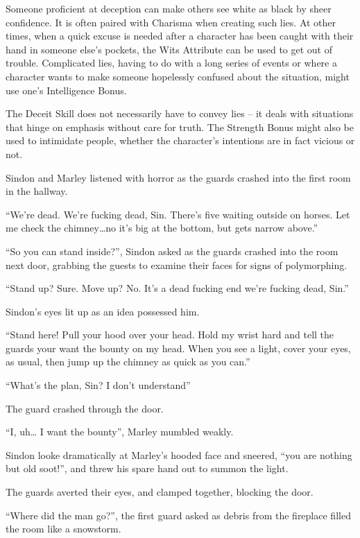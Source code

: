 \begin{multicols}{2}
Someone proficient at deception can make others see white as black by sheer confidence. It is often paired with Charisma when creating such lies. At other times, when a quick excuse is needed after a character has been caught with their hand in someone else's pockets, the Wits Attribute can be used to get out of trouble. Complicated lies, having to do with a long series of events or where a character wants to make someone hopelessly confused about the situation, might use one's Intelligence Bonus.

The Deceit Skill does not necessarily have to convey lies -- it deals with situations that hinge on emphasis without care for truth.
The Strength Bonus might also be used to intimidate people, whether the character's intentions are in fact vicious or not.

\begin{exampletext}
  Sindon and Marley listened with horror as the guards crashed into the first room in the hallway.

  ``We're dead.
  We're fucking dead, Sin.
  There's five waiting outside on horses.
  Let me check the chimney\ldots no it's big at the bottom, but gets narrow above.''

  ``So you can stand inside?'', Sindon asked as the guards crashed into the room next door, grabbing the guests to examine their faces for signs of polymorphing.

  ``Stand up?
  Sure.
  Move up?
  No.
  It's a dead fucking end we're fucking dead, Sin.''

  Sindon's eyes lit up as an idea possessed him.

  ``Stand here!
  Pull your hood over your head.
  Hold my wrist hard and tell the guards your want the bounty on my head.
  When you see a light, cover your eyes, as usual, then jump up the chimney as quick as you can.''

  ``What's the plan, Sin?
  I don't understand''

  The guard crashed through the door.

  ``I, uh\ldots
  I want the bounty'', Marley mumbled weakly.

  Sindon looke dramatically at Marley's hooded face and sneered, ``you are nothing but old soot!'', and threw his spare hand out to summon the light.

  The guards averted their eyes, and clamped together, blocking the door.
  
  ``Where did the man go?'', the first guard asked as debris from the fireplace filled the room like a snowstorm.


\end{exampletext}
\end{multicols}
